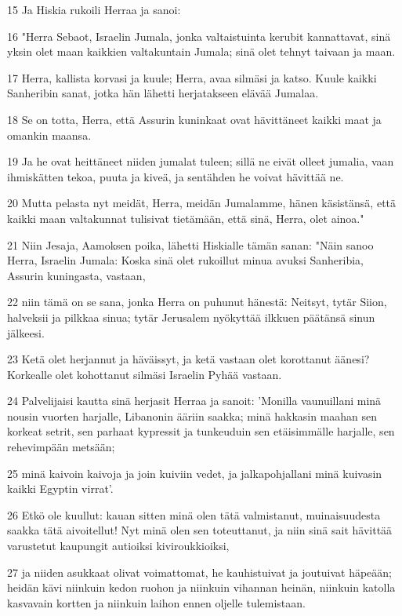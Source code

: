 \par 15 Ja Hiskia rukoili Herraa ja sanoi:
\par 16 "Herra Sebaot, Israelin Jumala, jonka valtaistuinta kerubit kannattavat, sinä yksin olet maan kaikkien valtakuntain Jumala; sinä olet tehnyt taivaan ja maan.
\par 17 Herra, kallista korvasi ja kuule; Herra, avaa silmäsi ja katso. Kuule kaikki Sanheribin sanat, jotka hän lähetti herjatakseen elävää Jumalaa.
\par 18 Se on totta, Herra, että Assurin kuninkaat ovat hävittäneet kaikki maat ja omankin maansa.
\par 19 Ja he ovat heittäneet niiden jumalat tuleen; sillä ne eivät olleet jumalia, vaan ihmiskätten tekoa, puuta ja kiveä, ja sentähden he voivat hävittää ne.
\par 20 Mutta pelasta nyt meidät, Herra, meidän Jumalamme, hänen käsistänsä, että kaikki maan valtakunnat tulisivat tietämään, että sinä, Herra, olet ainoa."
\par 21 Niin Jesaja, Aamoksen poika, lähetti Hiskialle tämän sanan: "Näin sanoo Herra, Israelin Jumala: Koska sinä olet rukoillut minua avuksi Sanheribia, Assurin kuningasta, vastaan,
\par 22 niin tämä on se sana, jonka Herra on puhunut hänestä: Neitsyt, tytär Siion, halveksii ja pilkkaa sinua; tytär Jerusalem nyökyttää ilkkuen päätänsä sinun jälkeesi.
\par 23 Ketä olet herjannut ja häväissyt, ja ketä vastaan olet korottanut äänesi? Korkealle olet kohottanut silmäsi Israelin Pyhää vastaan.
\par 24 Palvelijaisi kautta sinä herjasit Herraa ja sanoit: 'Monilla vaunuillani minä nousin vuorten harjalle, Libanonin ääriin saakka; minä hakkasin maahan sen korkeat setrit, sen parhaat kypressit ja tunkeuduin sen etäisimmälle harjalle, sen rehevimpään metsään;
\par 25 minä kaivoin kaivoja ja join kuiviin vedet, ja jalkapohjallani minä kuivasin kaikki Egyptin virrat'.
\par 26 Etkö ole kuullut: kauan sitten minä olen tätä valmistanut, muinaisuudesta saakka tätä aivoitellut! Nyt minä olen sen toteuttanut, ja niin sinä sait hävittää varustetut kaupungit autioiksi kiviroukkioiksi,
\par 27 ja niiden asukkaat olivat voimattomat, he kauhistuivat ja joutuivat häpeään; heidän kävi niinkuin kedon ruohon ja niinkuin vihannan heinän, niinkuin katolla kasvavain kortten ja niinkuin laihon ennen oljelle tulemistaan.
